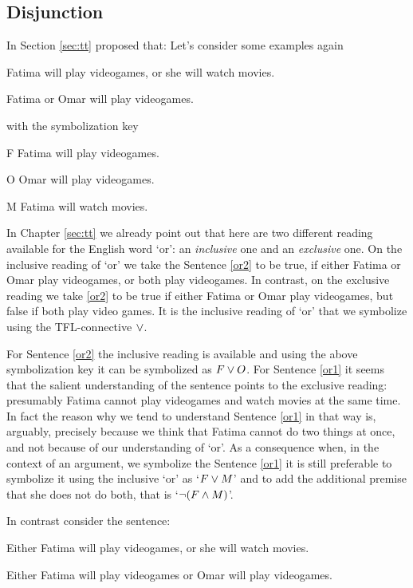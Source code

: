 \subsection{Disjunction}
In Section \ref{sec:tt} proposed that:
Let's consider some examples again
\begin{earg}
		\item[\ex{or1}] Fatima will play videogames, or she will watch movies.
		\item[\ex{or2}] Fatima or Omar will play videogames.
	\end{earg}
with the symbolization key
\begin{ekey}
		\item[F] Fatima will play videogames.
		\item[O] Omar will play videogames.
		\item[M] Fatima will watch movies.
	\end{ekey}

In Chapter \ref{sec:tt} we already point out that here are two different reading available for the English word `or': an \emph{inclusive} one and an \emph{exclusive} one. On the inclusive reading of `or' we take the Sentence \ref{or2} to be true, if either Fatima or Omar play videogames, or both play videogames. In contrast, on the exclusive reading we take \ref{or2} to be true if either Fatima or Omar play videogames, but false if both play video games. It is the inclusive reading of `or' that we symbolize using the TFL-connective $\vee$.

For Sentence \ref{or2} the inclusive reading is available and using the above symbolization key it can be symbolized as $F\vee O$. For Sentence \ref{or1} it seems that the salient understanding of the sentence points to the exclusive reading: presumably Fatima cannot play videogames and watch movies at the same time. In fact the reason why we tend to understand Sentence \ref{or1} in that way is, arguably, precisely because we think that Fatima cannot do two things at once, and not because of our understanding of `or'. As a consequence when, in the context of an argument, we symbolize the Sentence \ref{or1} it is still preferable to symbolize it using the inclusive `or' as `$F\vee M$' and to add the additional premise that she does not do both, that is `$\neg(F\mathbin{\wedge} M)$'.

In contrast consider the sentence:
\begin{earg}
		\item[\ex{eor1}] Either Fatima will play videogames, or she will watch movies.
		\item[\ex{eor2}] Either Fatima will play videogames or Omar will play videogames.
	\end{earg}

